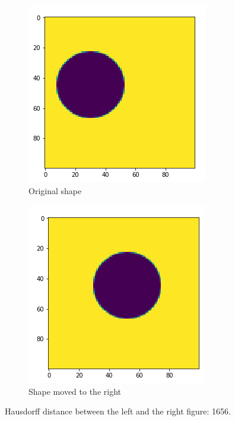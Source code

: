 \begin{figure}[H]
    \centering
    \begin{subfigure}{.5\textwidth}
        \centering
        \includegraphics[width=.75\linewidth]{chapters/06_hdm/images/hdm_original.png}
        \caption{Original shape}
    \end{subfigure}%
    \begin{subfigure}{.5\textwidth}
        \centering
        \includegraphics[width=.75\linewidth]{chapters/06_hdm/images/hdm_moved2.png}
        \caption{Shape moved to the right}
    \end{subfigure}
    \caption{Hausdorff distance between the left and the right figure: 1656. }
    \label{hdm_moved2}
\end{figure}

